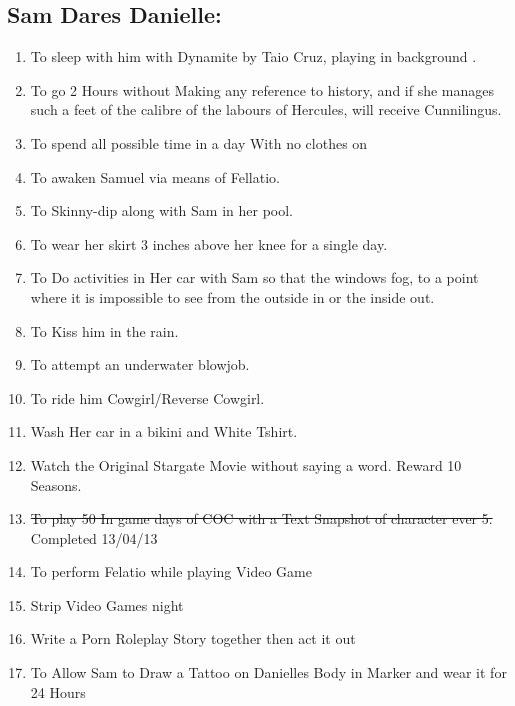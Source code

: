  

  \subsection{Sam Dares Danielle:}

\begin{enumerate}
\item  To sleep with him with Dynamite by Taio Cruz, playing in background .

\item  To go 2 Hours without Making any reference to history, and if she manages such a feet of the calibre of the labours of Hercules, will receive Cunnilingus. 

\item  To spend all possible time in a day With no clothes on

\item  To awaken Samuel via means of Fellatio.

\item  To Skinny-dip along with Sam in her pool.

\item  To wear her skirt 3 inches above her knee for a single day.

\item  To Do activities in Her car with Sam so that the windows fog, to a point where it is impossible to see from the outside in or the inside out.

\item  To Kiss him in the rain.

\item To attempt an underwater blowjob.

\item To ride him Cowgirl/Reverse Cowgirl.

\item Wash Her car in a bikini and White Tshirt.

\item Watch the Original Stargate Movie without saying a word. Reward 10 Seasons.

\item \sout{To play 50 In game days of COC with a Text Snapshot of character ever 5.} Completed 13/04/13

\item To perform Felatio while playing Video Game

\item Strip Video Games night

\item Write a Porn Roleplay Story together then act it out

\item To Allow Sam to Draw a Tattoo on Danielles Body in Marker and wear it for 24 Hours




\end{enumerate}
